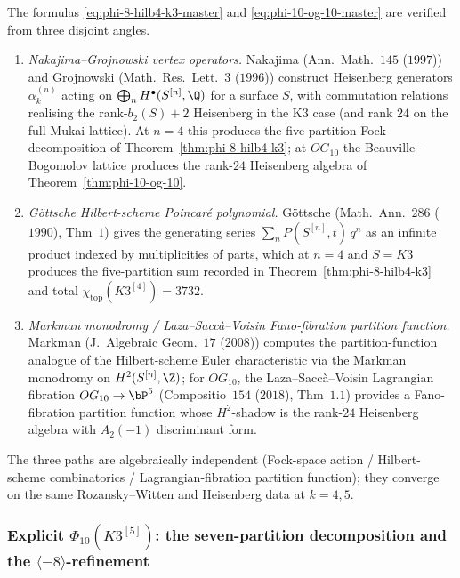 \begin{remark}
\label{rem:phi-8-phi-10-three-paths}
%
The formulas \eqref{eq:phi-8-hilb4-k3-master} and
\eqref{eq:phi-10-og-10-master} are verified from three disjoint angles.
\begin{enumerate}[label=\textup{(V\arabic*)}]
 \item \emph{Nakajima--Grojnowski vertex operators.} Nakajima
 (Ann.\ Math.~$145$ ($1997$)) and Grojnowski (Math.\ Res.\
 Lett.~$3$ ($1996$)) construct Heisenberg generators
 $\alpha_k^{(n)}$ acting on
 $\bigoplus_n H^\bullet(S^{[n]}, \Q)$ for a surface $S$, with
 commutation relations realising the rank-$b_2(S) + 2$
 Heisenberg in the K$3$ case (and rank $24$ on the full Mukai
 lattice). At $n = 4$ this produces the five-partition Fock
 decomposition of Theorem~\ref{thm:phi-8-hilb4-k3}; at
 \(OG_{10}\) the Beauville--Bogomolov lattice produces the rank-\(24\)
 Heisenberg algebra of Theorem~\ref{thm:phi-10-og-10}.
 \item \emph{G\"ottsche Hilbert-scheme Poincar\'e polynomial.}
 G\"ottsche (Math.\ Ann.~$286$ ($1990$), Thm~$1$) gives the
 generating series $\sum_n P(S^{[n]}, t)\, q^n$ as an infinite
 product indexed by multiplicities of parts, which at $n = 4$
 and $S = K3$ produces the five-partition sum recorded in
 Theorem~\ref{thm:phi-8-hilb4-k3} and total
 $\chi_{\mathrm{top}}(K3^{[4]}) = 3732$.
 \item \emph{Markman monodromy / Laza--Sacc\`a--Voisin
 Fano-fibration partition function.} Markman
 (J.\ Algebraic Geom.~$17$ ($2008$)) computes the
 partition-function analogue of the Hilbert-scheme Euler
 characteristic via the Markman monodromy on
 $H^2(S^{[n]}, \Z)$; for $OG_{10}$, the
 Laza--Sacc\`a--Voisin Lagrangian fibration $OG_{10} \to \bP^5$
 (Compositio~$154$ ($2018$), Thm~$1.1$) provides a
 Fano-fibration partition function whose \(H^2\)-shadow is the
 rank-\(24\) Heisenberg algebra with \(A_2(-1)\) discriminant form.
\end{enumerate}
The three paths are algebraically independent
(Fock-space action / Hilbert-scheme combinatorics /
Lagrangian-fibration partition function); they converge on the
same Rozansky--Witten and Heisenberg data at \(k=4,5\).
\end{remark}


\subsubsection{Explicit \texorpdfstring{$\Phi_{10}(K3^{[5]})$}{Phi-10(K3-[5])}: the seven-partition decomposition
 and the \texorpdfstring{$\langle -8\rangle$}{langle -8rangle}-refinement}
\label{subsubsec:phi-10-hilb5-k3-explicit}


